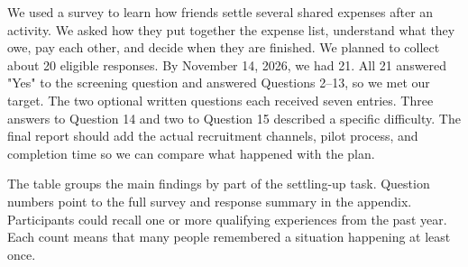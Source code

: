 \documentclass[letterpaper]{jdf}
\begin{document}
We used a survey to learn how friends settle several shared expenses after an activity. We asked how they put together the expense list, understand what they owe, pay each other, and decide when they are finished. We planned to collect about 20 eligible responses. By November 14, 2026, we had 21. All 21 answered "Yes" to the screening question and answered Questions 2--13, so we met our target. The two optional written questions each received seven entries. Three answers to Question 14 and two to Question 15 described a specific difficulty. The final report should add the actual recruitment channels, pilot process, and completion time so we can compare what happened with the plan.

The table groups the main findings by part of the settling-up task. Question numbers point to the full survey and response summary in the appendix. Participants could recall one or more qualifying experiences from the past year. Each count means that many people remembered a situation happening at least once.
\end{document}
